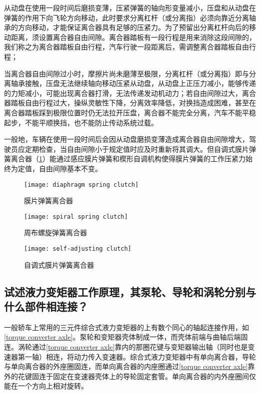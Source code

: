 \documentclass[UTF8]{ctexart}
\numberwithin{figure}{section}
\numberwithin{table}{section}
\begin{document}
从动盘在使用一段时间后磨损变薄，压紧弹簧的轴向形变量减小，压盘和从动盘在弹簧的作用下向飞轮方向移动，此时要求分离杠杆（或分离指）必须向靠近分离轴承的方向移动，才能保证离合器具有足够的压紧力。为了预留出分离杠杆向后的移动距离，须设置离合器自由间隙。离合器踏板有一段行程是用来消除这段间隙的，我们称之为离合器踏板自由行程，汽车行驶一段距离后，需调整离合器踏板自由行程；

当离合器自由间隙过小时，摩擦片尚未磨薄至极限，分离杠杆（或分离指）即与分离轴承接触，压盘无法继续轴向移动压紧从动盘，从动盘上正压力减小，能够传递的力矩减小，可能出现离合器打滑，无法传递发动机动力；若自由间隙过大，离合器踏板自由行程过大，操纵灵敏性下降，分离效率降低，对换挡造成困难，甚至在离合器踏板踩到极限位置时仍无法拉开压盘，离合器不能完全分离，汽车不能平稳起步，不能平顺换挡，也不能防止传动系统过载。

一般地，车辆在使用一段时间后会因从动盘磨损变薄造成离合器自由间隙增大，驾驶员应定期检查，当自由间隙小于规定值时应及时重新将其调大。但自调式膜片弹簧离合器（\cref{self-adjusting clutch}）能通过感应膜片弹簧和楔形自调机构使得膜片弹簧的工作压紧力始终为定值，自由间隙基本不变。

\begin{figure}[htbp]
	\centering
	\begin{minipage}[b]{0.5\textwidth}
		\centering
		\texttt{[image: diaphragm spring clutch]}
		\caption{膜片弹簧离合器}
		\label{diaphragm spring clutch}
	\end{minipage}
	\begin{minipage}[b]{0.4\textwidth}
		\centering
		\texttt{[image: spiral spring clutch]}
		\caption{周布螺旋弹簧离合器}
		\label{spiral spring clutch}
	\end{minipage}
	\begin{minipage}[b]{0.5\textwidth}
		\centering
		\texttt{[image: self-adjusting clutch]}
		\caption{自调式膜片弹簧离合器}
		\label{self-adjusting clutch}
	\end{minipage}
\end{figure}

\subsection{试述液力变矩器工作原理，其泵轮、导轮和涡轮分别与什么部件相连接？}

一般轿车上常用的三元件综合式液力变矩器的上有数个同心的轴起连接作用，如\cref{torque converter axle}。泵轮和变矩器壳体制成一体，而壳体前端与曲轴后端固连。涡轮通过\cref{torque converter axle}靠内的那圈花键与变矩器输出轴（同时也是变速器第一轴）相连，将动力传入变速器。综合式液力变矩器中有单向离合器，导轮与单向离合器的外座圈固连，而单向离合器的内座圈通过\cref{torque converter axle}靠外的花键固连于固定在变速器壳体上的导轮固定套管。单向离合器的内外座圈间仅能在一个方向上相对旋转。
\end{document}
